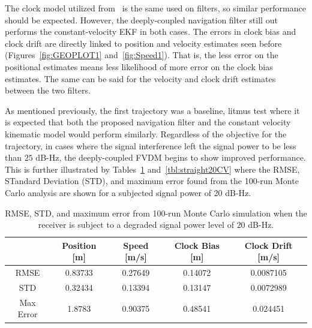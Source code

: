 The clock model utilized from~\cite{wangKalmanFilterBasedIntegrity} is the same used on filters, so similar performance should be expected. However, the deeply-coupled navigation filter still out performs the constant-velocity EKF in both cases. The errors in clock bias and clock drift are directly linked to position and velocity estimates seen before (Figures~\ref{fig:GEOPLOT1} and~\ref{fig:Speed1}). That is, the less error on the positional estimates means less likelihood of more error on the clock bias estimates. The same can be said for the velocity and clock drift estimates between the two filters.

As mentioned previously, the first trajectory was a baseline, litmus test where it is expected that both the proposed navigation filter and the constant velocity kinematic model would perform similarly. Regardless of the objective for the trajectory, in cases where the signal interference left the signal power to be less than \(25\) dB-Hz, the deeply-coupled FVDM begins to show improved performance. This is further illustrated by Tables~\ref{tbl:straight20FVDM} and~\ref{tbl:straight20CV} where the RMSE, STandard Deviation (STD), and maximum error found from the 100-run Monte Carlo analysis are shown for a subjected signal power of \(20\) dB-Hz.



\begin{table}[!ht]
    \caption{RMSE, STD, and maximum error from 100-run Monte Carlo simulation when the receiver is subject to a degraded signal power level of \(20\) dB-Hz.}\label{tbl:straight20FVDM}
    \centering
    \begin{tabular}{ccccc}
        \toprule
                  & Position [m] & Speed [m/s] & Clock Bias [m] & Clock Drift [m/s] \\
        \midrule
        RMSE      & 0.83733      & 0.27649     & 0.14072        & 0.0087105         \\
        STD       & 0.32434      & 0.13394     & 0.13147        & 0.0072989         \\
        Max Error & 1.8783       & 0.90375     & 0.48541        & 0.024451          \\
        \bottomrule
    \end{tabular}
\end{table}



